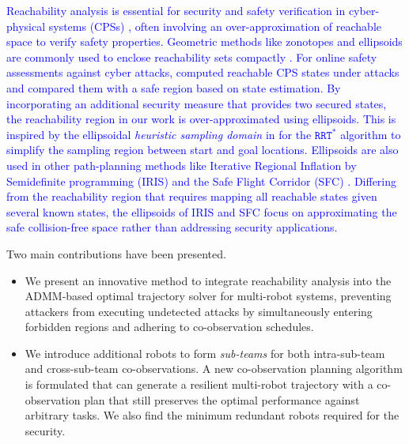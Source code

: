 \documentclass[10pt,twocolumn,twoside]{IEEEtran}
\newcommand{\new}[1]{\textcolor{blue}{#1}}
\begin{document}
\new{Reachability analysis is essential for security and safety verification in cyber-physical systems (CPSs) \cite{gueguen2009safety, ding2020secure}, often involving an over-approximation of reachable space to verify safety properties. Geometric methods like zonotopes and ellipsoids are commonly used to enclose reachability sets compactly \cite{kurzhanski2000ellipsoidal, lakhal2019interval, maiga2015comprehensive}. For online safety assessments against cyber attacks, \cite{kwon2017reachability} computed reachable CPS states under attacks and compared them with a safe region based on state estimation. By incorporating an additional security measure that provides two secured states, the reachability region in our work is over-approximated using ellipsoids. This is inspired by the ellipsoidal \emph{heuristic sampling domain} in \cite{gammell2014informed} for the $\mathtt{RRT^*}$ algorithm to simplify the sampling region between start and goal locations. Ellipsoids are also used in other path-planning methods like Iterative Regional Inflation by Semidefinite programming (IRIS) \cite{deits2015computing, ray2022free} and the Safe Flight Corridor (SFC) \cite{liu2017planning, fan2024flying}. Differing from the reachability region that requires mapping all reachable states given several known states, the ellipsoids of IRIS and SFC focus on approximating the safe collision-free space rather than addressing security applications.}

\noindent{} 
Two main contributions have been presented. 
\begin{itemize}
  \item We present an innovative method to integrate reachability analysis into the ADMM-based optimal trajectory solver for multi-robot systems, preventing attackers from executing undetected attacks by simultaneously entering forbidden regions and adhering to co-observation schedules.
  \item We introduce additional robots to form \emph{sub-teams} for both intra-sub-team and cross-sub-team co-observations. A new co-observation planning algorithm is formulated that can generate a resilient multi-robot trajectory with a co-observation plan that still preserves the optimal performance against arbitrary tasks. We also find the minimum redundant robots required for the security.
\end{itemize}
\end{document}
